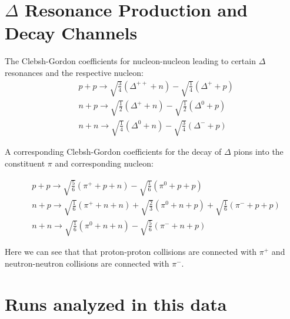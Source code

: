 \renewcommand{\thefigure}{A\arabic{figure}}
\renewcommand{\thetable}{A\arabic{figure}}

\section{$\Delta$ Resonance Production and Decay Channels}
\label{appen:deltadecay}

The Clebsh-Gordon coefficients for nucleon-nucleon leading to certain $\Delta$ resonances and the respective nucleon: 
\begin{equation}
\begin{split}
& p + p \rightarrow \sqrt{\frac{3}{4}}(\Delta^{++} + n) - \sqrt{\frac{1}{4}}(\Delta^{+} + p) \\
& n + p \rightarrow \sqrt{\frac{1}{2}}(\Delta^{+} + n) - \sqrt{\frac{1}{2}}(\Delta^{0} + p)  \\
& n + n \rightarrow \sqrt{\frac{1}{4}}(\Delta^{0} + n) - \sqrt{\frac{3}{4}}(\Delta^{-} + p) 
\end{split}
\label{eq:deltaProduction}
\end{equation}

A corresponding Clebsh-Gordon coefficients for the decay of $\Delta$ pions into the constituent $\pi$ and corresponding nucleon:

\begin{equation}
\begin{split}
& p + p \rightarrow \sqrt{\frac{5}{6}}(\pi^+ + p + n) - \sqrt{\frac{1}{6}}(\pi^0 + p + p) \\
& n + p \rightarrow \sqrt{\frac{1}{6}}(\pi^+ + n + n) + \sqrt{\frac{2}{3}}(\pi^0 + n + p) + \sqrt{\frac{1}{6}}(\pi^- + p + p)  \\
& n + n \rightarrow \sqrt{\frac{1}{6}}(\pi^0 + n + n) - \sqrt{\frac{5}{6}}(\pi^- + n + p) 
\end{split}
\label{eq:pionProduction}
\end{equation}

Here we can see that that proton-proton collisions are connected with $\pi^+$ and neutron-neutron collisions are connected with $\pi^-$. 


\section{Runs analyzed in this data}

\newcommand{\hsn}{$^{132}$Sn+$^{124}$Sn}
\newcommand{\mhsn}{$^{124}$Sn+$^{112}$Sn}
\newcommand{\mlsn}{$^{112}$Sn+$^{124}$Sn}
\newcommand{\lsn}{$^{108}$Sn+$^{112}$Sn}


